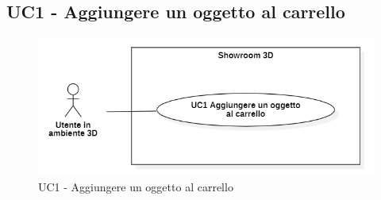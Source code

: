 \subsection{UC1 - Aggiungere un oggetto al carrello}

\begin{figure}[H]
  \renewcommand{\thefigure}{1}
  \includegraphics[width=\linewidth]{./res/images/UC1.png}
  \caption{UC1 - Aggiungere un oggetto al carrello}
  \label{fig:UC 1}
\end{figure}

